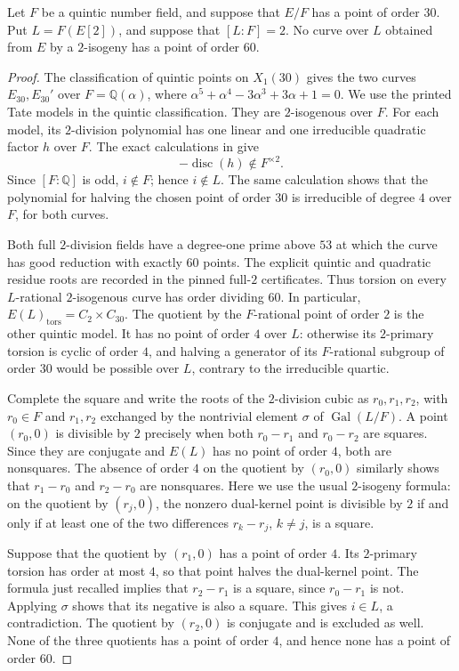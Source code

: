 \begin{lemma}\label{lem:decic60-quintic-descent}
Let $F$ be a quintic number field, and suppose that $E/F$ has a point
of order $30$. Put $L=F(E[2])$, and suppose that $[L:F]=2$.
No curve over $L$ obtained from $E$ by a $2$-isogeny has a point
of order $60$.
\end{lemma}
\begin{proof}
The classification of quintic points on $X_1(30)$ gives the two
curves $E_{30},E_{30}'$ over
$F=\mathbb Q(\alpha)$, where
$\alpha^5+\alpha^4-3\alpha^3+3\alpha+1=0$.
We use the printed Tate models in the quintic classification.
They are $2$-isogenous over $F$.
For each model, its $2$-division polynomial has one linear and
one irreducible quadratic factor $h$ over $F$.
The exact calculations in  give
\[
 -\operatorname{disc}(h)\notin F^{\times2}.
\]
Since $[F:\mathbb Q]$ is odd, $i\notin F$; hence $i\notin L$.
The same calculation shows that the polynomial for halving the
chosen point of order $30$ is irreducible of degree $4$ over $F$,
for both curves.

Both full $2$-division fields have a degree-one prime above $53$
at which the curve has good reduction with exactly $60$ points.
The explicit quintic and quadratic residue roots are recorded in
the pinned full-$2$ certificates. Thus torsion on every
$L$-rational $2$-isogenous curve has order dividing $60$.
In particular, $E(L)_{\mathrm{tors}}=C_2\times C_{30}$.
The quotient by the $F$-rational point of order $2$ is the other
quintic model. It has no point of order $4$ over $L$: otherwise its
$2$-primary torsion is cyclic of order $4$, and halving a generator
of its $F$-rational subgroup of order $30$ would be possible over
$L$, contrary to the irreducible quartic.

Complete the square and write the roots of the $2$-division cubic
as $r_0,r_1,r_2$, with $r_0\in F$ and $r_1,r_2$ exchanged by the
nontrivial element $\sigma$ of $\operatorname{Gal}(L/F)$.
A point $(r_0,0)$ is divisible by $2$ precisely when both
$r_0-r_1$ and $r_0-r_2$ are squares. Since they are conjugate and
$E(L)$ has no point of order $4$, both are nonsquares.
The absence of order $4$ on the quotient by $(r_0,0)$ similarly
shows that $r_1-r_0$ and $r_2-r_0$ are nonsquares.
Here we use the usual $2$-isogeny formula: on the quotient by
$(r_j,0)$, the nonzero dual-kernel point is divisible by $2$ if and
only if at least one of the two differences $r_k-r_j$, $k\ne j$,
is a square.

Suppose that the quotient by $(r_1,0)$ has a point of order $4$.
Its $2$-primary torsion has order at most $4$, so that point halves
the dual-kernel point. The formula just recalled implies that
$r_2-r_1$ is a square, since $r_0-r_1$ is not.
Applying $\sigma$ shows that its negative is also a square.
This gives $i\in L$, a contradiction. The quotient by $(r_2,0)$
is conjugate and is excluded as well. None of the three quotients
has a point of order $4$, and hence none has a point of order $60$.
\end{proof}
